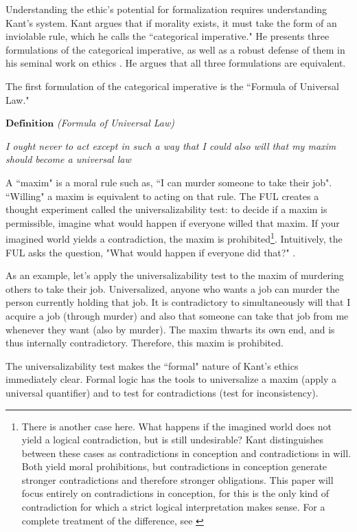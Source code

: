 \begin{isabellebody}
\begin{isamarkuptext}
Understanding the ethic's potential for formalization requires understanding Kant's system. Kant argues 
that if morality exists, it must take the form of an inviolable rule, which he calls the ``categorical
imperative." He presents three formulations of the categorical imperative, as well as a robust defense
of them in his seminal work on ethics \cite{groundwork}. He argues that all three formulations are 
equivalent. 

The first formulation of the categorical imperative is the ``Formula of Universal Law." 

$\textbf{Definition}$ \emph{(Formula of Universal Law)}

\emph{I ought never to act except in such a way that I could also will that my maxim should become a universal law} \cite{groundwork}

A ``maxim" is a moral rule such as, ``I can murder someone to take their job". ``Willing" a maxim is 
equivalent to acting on that rule. The FUL creates a thought experiment called the universalizability 
test: to decide if a maxim is permissible, imagine what would happen if everyone willed that maxim. 
If your imagined world yields a contradiction, the maxim is prohibited\footnote{There is another case here.
What happens if the imagined world does not yield a logical contradiction, but is still undesirable? Kant 
distinguishes between these cases as contradictions in conception and contradictions in will. Both yield moral
prohibitions, but contradictions in conception generate stronger contradictions and therefore stronger obligations. 
This paper will focus entirely on contradictions in conception, for this is the only kind of contradiction 
for which a strict logical interpretation makes sense. For a complete treatment of the difference, see \cite{groundwork, KorsgaardFUL}}. Intuitively, the FUL asks 
the question, "What would happen if everyone did that?" \cite{KorsgaardFUL}. 

As an example, let's apply the universalizability test to the maxim of murdering others to take their job.
Universalized, anyone who wants a job can murder the person currently holding that job. It is contradictory
to simultaneously will that I acquire a job (through murder) and also that someone can take that job from me 
whenever they want (also by murder). The maxim thwarts its own end, and is thus internally contradictory.
 Therefore, this maxim is prohibited.

The universalizability test makes the ``formal" nature of Kant's ethics immediately clear. Formal 
logic has the tools to universalize a maxim (apply a universal quantifier) and to test for 
contradictions (test for inconsistency). 


\end{isamarkuptext}
\end{isabellebody}
